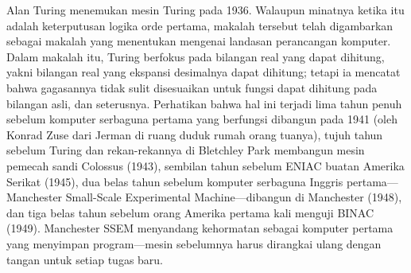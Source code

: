 \documentclass[../../../include/open-logic-section]{subfiles}
\begin{document}
\begin{history}
Alan Turing menemukan mesin Turing pada 1936. Walaupun minatnya ketika itu
adalah keterputusan logika orde pertama, makalah tersebut telah digambarkan
sebagai makalah yang menentukan mengenai landasan perancangan komputer. Dalam
makalah itu, Turing berfokus pada bilangan real yang dapat dihitung, yakni
bilangan real yang ekspansi desimalnya dapat dihitung; tetapi ia mencatat bahwa
gagasannya tidak sulit disesuaikan untuk fungsi dapat dihitung pada bilangan
asli, dan seterusnya. Perhatikan bahwa hal ini terjadi lima tahun penuh sebelum
komputer serbaguna pertama yang berfungsi dibangun pada 1941 (oleh Konrad Zuse
dari Jerman di ruang duduk rumah orang tuanya), tujuh tahun sebelum Turing dan
rekan-rekannya di Bletchley Park membangun mesin pemecah sandi Colossus (1943),
sembilan tahun sebelum ENIAC buatan Amerika Serikat (1945), dua belas tahun
sebelum komputer serbaguna Inggris pertama---Manchester Small-Scale
Experimental Machine---dibangun di Manchester (1948), dan tiga belas tahun
sebelum orang Amerika pertama kali menguji BINAC (1949). Manchester SSEM
menyandang kehormatan sebagai komputer pertama yang menyimpan program---mesin
sebelumnya harus dirangkai ulang dengan tangan untuk setiap tugas baru.
\end{history}
\end{document}
